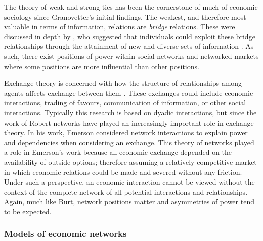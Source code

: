 The theory of weak and strong ties has been the cornerstone of much of economic sociology since Granovetter's initial findings. The weakest, and therefore most valuable in terms of information, relations are \emph{bridge} relations. These were discussed in depth by \citet{Burt1992}, who suggested that individuals could exploit these bridge relationships through the attainment of new and diverse sets of information \citep{Burt2004}. As such, there exist positions of power within social networks and networked markets where some positions are more influential than other positions.

Exchange theory is concerned with how the structure of relationships among agents affects exchange between them \citep{CookWhitmeyer1992}. These exchanges could include economic interactions, trading of favours, communication of information, or other social interactions. Typically this research is based on dyadic interactions, but since the work of Robert \citet{Emerson1962, Emerson1972a, Emerson1972b, Emerson1976} networks have played an increasingly important role in exchange theory. In his work, Emerson considered network interactions to explain power and dependencies when considering an exchange. This theory of networks played a role in Emerson's work because all economic exchange depended on the availability of outside options; therefore assuming a relatively competitive market in which economic relations could be made and severed without any friction. Under such a perspective, an economic interaction cannot be viewed without the context of the complete network of all potential interactions and relationships. Again, much like Burt, network positions matter and asymmetries of power tend to be expected.

\subsubsection{Models of economic networks}

